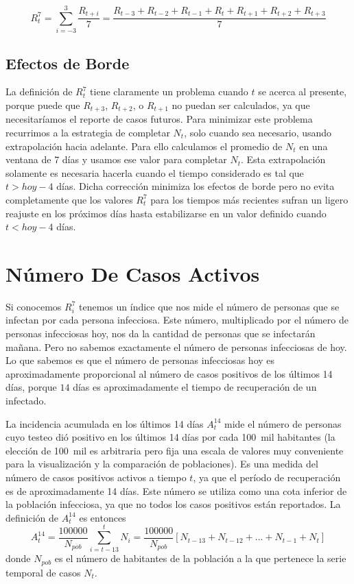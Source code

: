 \documentclass[12pt,a4paper]{article}
\begin{document}
\begin{equation}
R^7_t = \sum_{i=-3}^{3} \frac{R_{t+i}}{7} = 
\frac{R_{t-3}+R_{t-2}+R_{t-1}+R_t+R_{t+1}+R_{t+2}+R_{t+3}}{7}
\end{equation}

\subsection*{Efectos de Borde}
La definición de $R^7_t$ tiene claramente 
un problema cuando $t$ se acerca al presente, porque 
puede que $R_{t+3}$, $R_{t+2}$, o $R_{t+1}$ no puedan 
ser calculados, ya que necesitaríamos el reporte de casos 
futuros. Para minimizar este problema recurrimos a la estrategia 
de completar $N_t$, solo cuando sea necesario, 
usando extrapolación hacia adelante. Para ello 
calculamos el promedio de $N_t$ en una ventana de 7 días 
y usamos ese valor para completar $N_t$. 
Esta extrapolación solamente es necesaria hacerla 
cuando el tiempo considerado es tal que $t>hoy-4$ días. Dicha corrección minimiza los efectos de borde 
pero no evita completamente que los valores 
$R^7_t$ para los tiempos más recientes 
sufran un ligero reajuste en los próximos días 
hasta estabilizarse en un valor definido 
cuando $t<hoy-4$ días.  

\section*{Número De Casos Activos}

Si conocemos $R^7_i$ tenemos un índice que nos mide el número de personas 
que se infectan por cada persona infecciosa. Este número,
multiplicado por el número de personas infecciosas hoy, nos da la 
cantidad de personas que se infectarán mañana.
Pero no sabemos exactamente el número de personas infecciosas de hoy. 
Lo que sabemos es que el número de personas infecciosas hoy es aproximadamente 
proporcional al número de casos positivos de los últimos 14 días, 
porque $14$ días es aproximadamente el tiempo de recuperación de un infectado.

La incidencia acumulada en los últimos 14 días $A^{14}_t$ mide el número de personas cuyo testeo dió positivo en los últimos 14 días por cada 100~mil habitantes (la elección de 100~mil es arbitraria pero fija una escala de valores muy conveniente para la visualización y la comparación de poblaciones). Es una medida del número de casos positivos activos a tiempo 
$t$, ya que el período de recuperación es de aproximadamente 14 días. 
Este número se utiliza como una cota inferior de la población infecciosa, ya que no todos los casos positivos están reportados. 
La definición de $A^{14}_t$ es entonces  
\begin{equation}
A^{14}_t = \frac{100000}{N_{pob}}\sum_{i=t-13}^t N_i = \frac{100000}{N_{pob}}[N_{t-13}+N_{t-12}+...+N_{t-1}+N_{t}]
\end{equation}
donde $N_{pob}$ es el número de habitantes de la población 
a la que pertenece la serie temporal de casos $N_t$.
\end{document}
